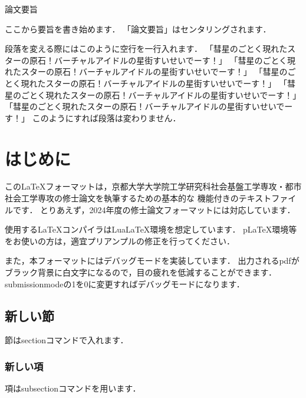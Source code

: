 \documentclass[a4paper, 11pt]{report}
\begin{document}
\begin{center}
    {\fontsize{12pt}{26pt}\selectfont \gtfamily 論文要旨} %
\end{center}
\par \indent
ここから要旨を書き始めます．
「論文要旨」はセンタリングされます．

段落を変える際にはこのように空行を一行入れます．
「彗星のごとく現れたスターの原石！バーチャルアイドルの星街すいせいでーす！」
「彗星のごとく現れたスターの原石！バーチャルアイドルの星街すいせいでーす！」
「彗星のごとく現れたスターの原石！バーチャルアイドルの星街すいせいでーす！」
「彗星のごとく現れたスターの原石！バーチャルアイドルの星街すいせいでーす！」
「彗星のごとく現れたスターの原石！バーチャルアイドルの星街すいせいでーす！」
このようにすれば段落は変わりません．
\newpage

\tableofcontents
\newpage

\clearpage
{}

\chapter{はじめに}
この\LaTeX フォーマットは，京都大学大学院工学研究科社会基盤工学専攻・都市社会工学専攻の修士論文を執筆するための基本的な
機能付きのテキストファイルです．
とりあえず，2024年度の修士論文フォーマットには対応しています．

使用する\LaTeX コンパイラはLuaLaTeX環境を想定しています．
pLaTeX環境等をお使いの方は，適宜プリアンプルの修正を行ってください．

また，本フォーマットにはデバッグモードを実装しています．
出力されるpdfがブラック背景に白文字になるので，目の疲れを低減することができます．
submissionmodeの1を0に変更すればデバッグモードになります．

\section{新しい節}
節はsectionコマンドで入れます．

\subsection{新しい項}
項はsubsectionコマンドを用います．
\end{document}
